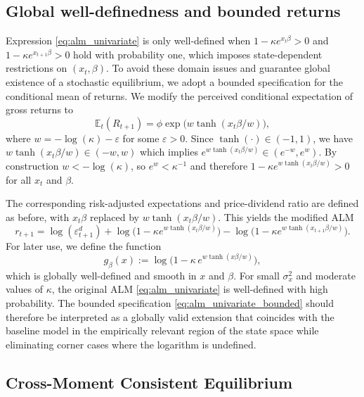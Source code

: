 \documentclass[11pt]{article}
\begin{document}
\subsection{Global well-definedness and bounded returns}

Expression \eqref{eq:alm_univariate} is only well-defined when $1 - \kappa e^{x_t \beta} > 0$ and $1 - \kappa e^{x_{t+1} \beta} > 0$ hold with probability one, which imposes state-dependent restrictions on $(x_t,\beta)$. To avoid these domain issues and guarantee global existence of a stochastic equilibrium, we adopt a bounded specification for the conditional mean of returns. We modify the perceived conditional expectation of gross returns to
\begin{equation}
    \mathbb{E}_t(R_{t+1}) = \phi \exp\bigl( w \tanh(x_t \beta / w) \bigr),
\end{equation}
where $w = -\log(\kappa) - \varepsilon$ for some $\varepsilon > 0$. Since $\tanh(\cdot) \in (-1,1)$, we have $w \tanh(x_t \beta / w) \in (-w,w)$ which implies $e^{w \tanh(x_t \beta / w)} \in (e^{-w}, e^{w})$. By construction $w < -\log(\kappa)$, so $e^{w} < \kappa^{-1}$ and therefore $1 - \kappa e^{w \tanh(x_t \beta / w)} > 0$ for all $x_t$ and $\beta$.

The corresponding risk-adjusted expectations and price-dividend ratio are defined as before, with $x_t \beta$ replaced by $w \tanh(x_t \beta / w)$. This yields the modified ALM
\begin{equation}\label{eq:alm_univariate_bounded}
    r_{t+1} = \log(\varepsilon^d_{t+1})
    + \log\bigl(1 - \kappa e^{w \tanh(x_t \beta / w)}\bigr)
    - \log\bigl(1 - \kappa e^{w \tanh(x_{t+1} \beta / w)}\bigr).
\end{equation}
For later use, we define the function
\begin{equation}\label{eq:g_beta_def}
    g_{\beta}(x) 
    := \log\bigl(1 - \kappa\, e^{w \tanh(x \beta/w)}\bigr),
\end{equation}
which is globally well-defined and smooth in $x$ and $\beta$. For small $\sigma_x^2$ and moderate values of $\kappa$, the original ALM \eqref{eq:alm_univariate} is well-defined with high probability. The bounded specification \eqref{eq:alm_univariate_bounded} should therefore be interpreted as a globally valid extension that coincides with the baseline model in the empirically relevant region of the state space while eliminating corner cases where the logarithm is undefined.

\subsection{Cross-Moment Consistent Equilibrium}
\end{document}
